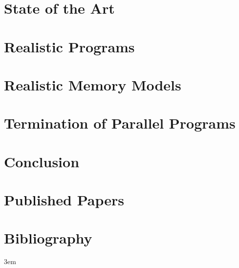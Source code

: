 \documentclass[11pt,twoside,a4paper]{book}
\theoremstyle{mydefstyle}
\begin{document}
\chapter{State of the Art}


\chapter{Realistic Programs}


\chapter{Realistic Memory Models}


\chapter{Termination of Parallel Programs}


\chapter{Conclusion}

\appendix

\chapter{Published Papers}


\chapter{Bibliography}

{
    \emergencystretch 3em %
    \printbibliography[heading=none]
}
\end{document}
